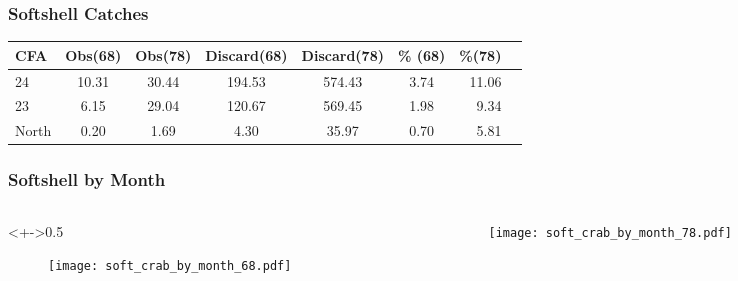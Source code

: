 
\begin{frame}
\frametitle{Softshell Catches}

\begin{table}[ht]
\setlength{\tabcolsep}{0.1cm}
\centering
\begin{tabular}{lcccccrr}
  \hline
 CFA & Obs(68) & Obs(78) & Discard(68) & Discard(78) & \% (68) &\%(78) \\ 
  \hline
 24 & 10.31 & 30.44 & 194.53 & 574.43 & 3.74 & 11.06 \\ 
 23 & 6.15 & 29.04 & 120.67 & 569.45 & 1.98 & 9.34 \\ 
 North & 0.20 & 1.69 & 4.30 & 35.97 & 0.70 & 5.81 \\ 
   \hline
\end{tabular}
\end{table}

\end{frame}



\begin{frame}
\frametitle{Softshell by Month}

\begin{columns}
\begin{column}<+->{0.5\textwidth}
 \vspace*{-0.5cm}
\begin{figure}
\centerline{\texttt{[image: soft\_crab\_by\_month\_68.pdf]}}

\end{figure}
\end{column}

\begin{column}{0.5\textwidth}
\begin{figure}
 \vspace*{-0.5cm}

\centerline{\texttt{[image: soft\_crab\_by\_month\_78.pdf]}}

 \end{figure}

\end{column}
\end{columns}


\end{frame}


